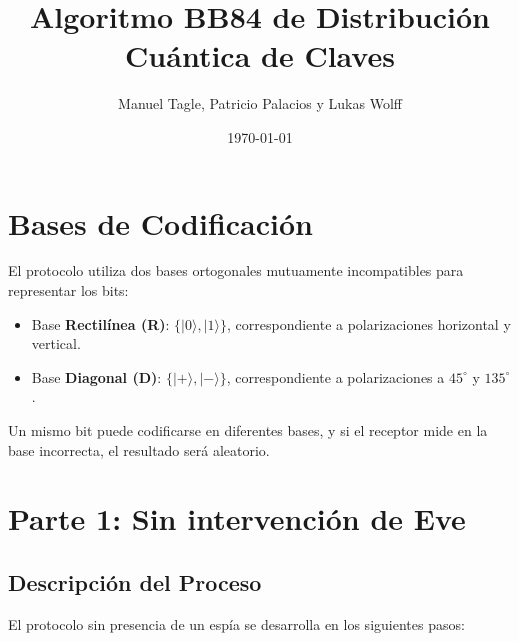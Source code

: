 \documentclass[12pt]{article}
\title{\textbf{Algoritmo BB84 de Distribución Cuántica de Claves}}
\author{Manuel Tagle, Patricio Palacios y Lukas Wolff}
\date{\today}
\begin{document}
\maketitle

\section{Bases de Codificación}
El protocolo utiliza dos bases ortogonales mutuamente incompatibles para representar los bits:
\begin{itemize}
    \item Base \textbf{Rectilínea (R)}: $\{|0\rangle, |1\rangle\}$, correspondiente a polarizaciones horizontal y vertical.
    \item Base \textbf{Diagonal (D)}: $\{|+\rangle, |-\rangle\}$, correspondiente a polarizaciones a $45^\circ$ y $135^\circ$.
\end{itemize}
Un mismo bit puede codificarse en diferentes bases, y si el receptor mide en la base incorrecta, el resultado será aleatorio.

\section{Parte 1: Sin intervención de Eve}
\subsection{Descripción del Proceso}
El protocolo sin presencia de un espía se desarrolla en los siguientes pasos:
\end{document}
